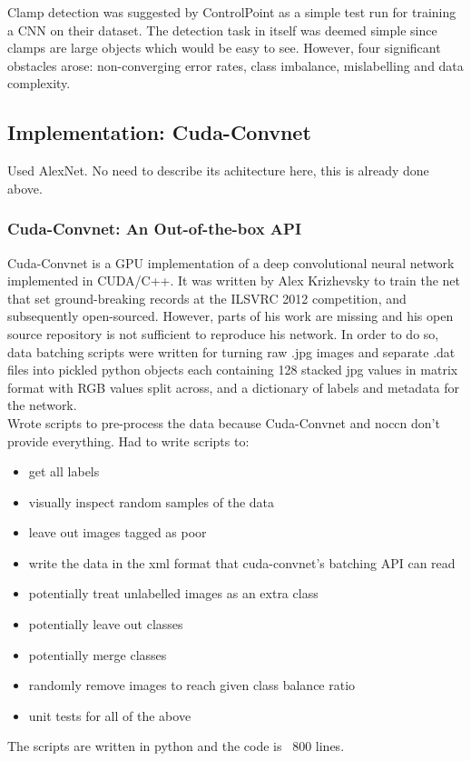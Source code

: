\documentclass[a4paper,11pt]{article}
\begin{document}
Clamp detection was suggested by ControlPoint as a simple test run for training a CNN on their dataset. The detection task in itself was deemed simple since clamps are large objects which would be easy to see. However, four significant obstacles arose: non-converging error rates, class imbalance, mislabelling and data complexity.\\


\subsection{Implementation: Cuda-Convnet}

Used AlexNet. No need to describe its achitecture here, this is already done above. \\

\subsubsection{Cuda-Convnet: An Out-of-the-box API}

Cuda-Convnet is a GPU implementation of a deep convolutional neural network implemented in CUDA/C++. It was written by Alex Krizhevsky to train the net that set ground-breaking records at the ILSVRC 2012 competition, and subsequently open-sourced. However, parts of his work are missing and his open source repository is not sufficient to reproduce his network. In order to do so, data batching scripts were written for turning raw .jpg images and separate .dat files into pickled python objects each containing 128 stacked jpg values in matrix format with RGB values split across, and a dictionary of labels and metadata for the network. \\

Wrote scripts to pre-process the data because Cuda-Convnet and noccn don't provide everything. Had to write scripts to:
\begin{itemize}
\item get all labels
\item visually inspect random samples of the data
\item leave out images tagged as poor
\item write the data in the xml format that cuda-convnet's batching API can read
\item potentially treat unlabelled images as an extra class
\item potentially leave out classes 
\item potentially merge classes
\item randomly remove images to reach given class balance ratio
\item unit tests for all of the above
\end{itemize}
The scripts are written in python and the code is ~800 lines.
\end{document}
